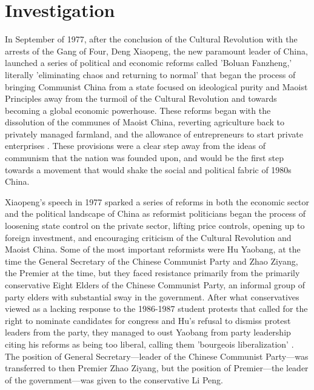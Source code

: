 \documentclass{paper}
\begin{document}
\section{Investigation}
In September of 1977, after the conclusion of the Cultural Revolution with the arrests of the Gang of Four, Deng Xiaopeng, the new paramount leader of China, launched a series of political and economic reforms called 'Boluan Fanzheng,' literally 'eliminating chaos and returning to normal' that began the process of bringing Communist China from a state focused on ideological purity and Maoist Principles away from the turmoil of the Cultural Revolution and towards becoming a global economic powerhouse.
These reforms began with the dissolution of the communes of Maoist China, reverting agriculture back to privately managed farmland, and the allowance of entrepreneurs to start private enterprises \cite{reforms}.
These provisions were a clear step away from the ideas of communism that the nation was founded upon, and would be the first step towards a movement that would shake the social and political fabric of 1980s China.

Xiaopeng's speech in 1977 sparked a series of reforms in both the economic sector and the political landscape of China as reformist politicians began the process of loosening state control on the private sector, lifting price controls, opening up to foreign investment, and encouraging criticism of the Cultural Revolution and Maoist China.
Some of the most important reformists were Hu Yaobang, at the time the General Secretary of the Chinese Communist Party and Zhao Ziyang, the Premier at the time, but they faced resistance primarily from the primarily conservative Eight Elders of the Chinese Communist Party, an informal group of party elders with substantial sway in the government.
After what conservatives viewed as a lacking response to the 1986-1987 student protests that called for the right to nominate candidates for congress and Hu's refusal to dismiss protest leaders from the party, they managed to oust Yaobang from party leadership citing his reforms as being too liberal, calling them 'bourgeois liberalization' \cite{deng}.
The position of General Secretary---leader of the Chinese Communist Party---was transferred to then Premier Zhao Ziyang, but the position of Premier---the leader of the government---was given to the conservative Li Peng.
\end{document}
